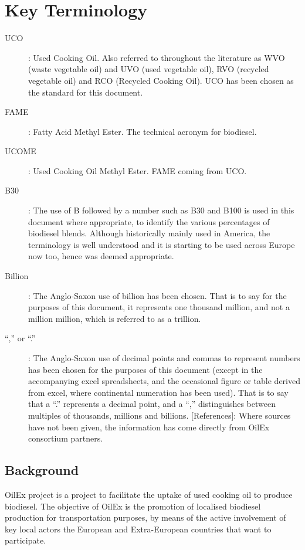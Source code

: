 \documentclass[11pt,fleqn]{book} %
\begin{document}


\section{Key Terminology}
\begin{description}
	\item[UCO]: Used Cooking Oil. Also referred to throughout the literature as WVO (waste vegetable
oil) and UVO (used vegetable oil), RVO (recycled vegetable oil) and RCO (Recycled Cooking
Oil). UCO has been chosen as the standard for this document.
    \item[FAME]: Fatty Acid Methyl Ester. The technical acronym for biodiesel.
    \item[UCOME]: Used Cooking Oil Methyl Ester. FAME coming from UCO.
	\item[B30]: The use of B followed by a number such as B30 and B100 is used in this document
where appropriate, to identify the various percentages of biodiesel blends. Although
historically mainly used in America, the terminology is well understood and it is starting to be
used across Europe now too, hence was deemed appropriate.
    \item[Billion]: The Anglo-Saxon use of billion has been chosen. That is to say for the purposes of
this document, it represents one thousand million, and not a million million, which is referred
to as a trillion.
    \item[“,” or “.”]: The Anglo-Saxon use of decimal points and commas to represent numbers has
been chosen for the purposes of this document (except in the accompanying excel
spreadsheets, and the occasional figure or table derived from excel, where continental
numeration has been used). That is to say that a “.” represents a decimal point, and a “,”
distinguishes between multiples of thousands, millions and billions.
[References]: Where sources have not been given, the information has come directly from
OilEx consortium partners.
    \end{description}


\subsection{Background}
OilEx project is a project to facilitate the uptake of used cooking oil to produce biodiesel. The objective of OilEx is the promotion of localised biodiesel production for transportation purposes, by means of the active involvement of key local actors the European and Extra-European countries that want to participate.
\end{document}
